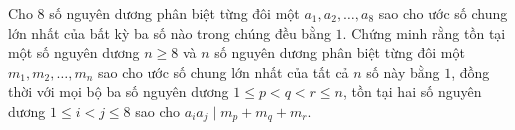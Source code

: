 \ifshowproblem
\begin{problem}\label{example:CHN-2015-SEMO-11-P4}
    Cho $8$ số nguyên dương phân biệt từng đôi một $a_1, a_2, \ldots, a_8$
    sao cho ước số chung lớn nhất của bất kỳ ba số nào trong chúng đều bằng $1$.
    Chứng minh rằng tồn tại một số nguyên dương $n \geq 8$ và $n$ số nguyên dương phân biệt từng đôi một $m_1, m_2, \ldots, m_n$
    sao cho ước số chung lớn nhất của tất cả $n$ số này bằng $1$, đồng thời với mọi bộ ba số nguyên dương $1 \leq p < q < r \leq n$,
    tồn tại hai số nguyên dương $1 \leq i < j \leq 8$ sao cho $a_i a_j \mid m_p + m_q + m_r$.
\end{problem}
\fi

\footnotemark
{}
\fi